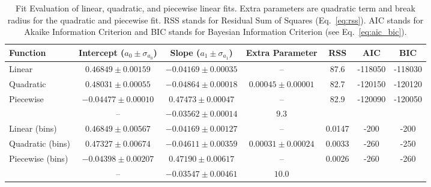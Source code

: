 
\begin{table*}
\caption{
Fit Evaluation of linear, quadratic, and piecewise linear fits.
Extra parameters are quadratic term and break radius for the quadratic and piecewise fit.
RSS stands for Residual Sum of Squares (Eq.~\ref{eq:rss}).
AIC stands for Akaike Information Criterion and BIC stands for Bayesian Information Criterion (see Eq.~\ref{eq:aic_bic}).
}
\label{tab:global_fit_results_comparison}
\begin{tabularx}{\textwidth}{lCCCccc}
\hline
Function & Intercept ($a_0 \pm \sigma_{a_0}$) & Slope ($a_1 \pm \sigma_{a_1}$) & Extra Parameter & RSS & AIC & BIC \\
\hline
Linear & $0.46849 \pm 0.00159$  & $-0.04169 \pm 0.00035$ & -- & 87.6 & -118050  & -118030 \\ 
Quadratic & $0.48031 \pm 0.00055$  & $-0.04864 \pm 0.00018$ & $0.00045 \pm 0.00001$ & 82.7 & -120150  & -120120 \\ 
Piecewise & $-0.04477 \pm 0.00010$ & $0.47473 \pm 0.00047$ & -- & 82.9 & -120090  & -120050 \\ 
 & -- & $-0.03562 \pm 0.00014$ & $9.3$ & & & \\ 
\hline
Linear (bins)& $0.46849 \pm 0.00567$  & $-0.04169 \pm 0.00127$ & -- & 0.0147 & -200  & -200 \\ 
Quadratic (bins) & $0.47327 \pm 0.00674$  & $-0.04611 \pm 0.00359$ & $0.00031 \pm 0.00024$ & 0.0033 & -260  & -250 \\ 
Piecewise (bins) & $-0.04398 \pm 0.00207$ & $0.47190 \pm 0.00617$ & -- & 0.0026 & -260  & -260 \\ 
 & -- & $-0.03547 \pm 0.00461$ & $10.0$ & & & \\ 
\hline
\end{tabularx}
\end{table*}
